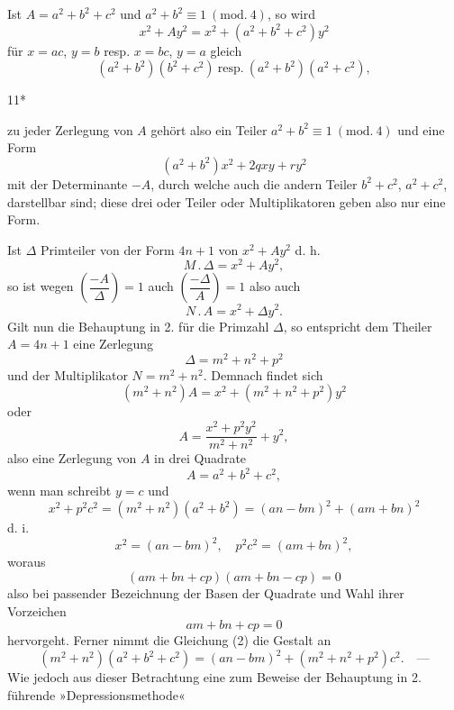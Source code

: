  Ist $A=a^2+b^2+c^2$ und $a^2+b^2\equiv1\ (\mathrm{mod.}\ 4)$, so wird
\[
x^2+Ay^2=x^2+(a^2+b^2+c^2)y^2
\]
\noindent für $x=ac$, $y=b$ resp. $x=bc$, $y=a$ gleich
\[
(a^2+b^2)(b^2+c^2)\ \text{resp.}\ (a^2+b^2)(a^2+c^2),
\]
\par\vfill\noindent\hfill11*\par\clearpage
{}
\noindent zu jeder Zerlegung von $A$ gehört also ein Teiler $a^2+b^2\equiv1\ (\mathrm{mod.}\ 4)$ und eine Form
\[
(a^2+b^2)x^2+2qxy+ry^2
\]
\noindent mit der Determinante $-A$, durch welche auch die andern Teiler $b^2+c^2$, $a^2+c^2$, darstellbar sind; diese
drei  oder  Teiler oder Multiplikatoren geben also nur eine Form.
\par\noindent\hspace*{\parindent} Ist $\Delta$ Primteiler von der Form $4n+1$ von $x^2+Ay^2$ d. h.
\[
M\mathpunct{.}\Delta=x^2+Ay^2,
\]
\noindent so ist wegen $\left(\dfrac{-A}{\Delta}\right)=1$ auch $\left(\dfrac{-\Delta}{A}\right)=1$ also auch
\[
N\mathpunct{.}A=x^2+\Delta y^2.
\]
\noindent Gilt nun die Behauptung in 2. für die Primzahl $\Delta$, so entspricht dem Theiler $A=4n+1$ eine Zerlegung
\begin{equation*}\Delta=m^2+n^2+p^2\tag*{(1)}\end{equation*}
\noindent und der Multiplikator $N=m^2+n^2$. Demnach findet sich
\begin{equation*}(m^2+n^2)A=x^2+(m^2+n^2+p^2)y^2\tag*{(2)}\end{equation*}
\noindent oder
\[
A=\frac{x^2+p^2y^2}{m^2+n^2}+y^2,
\]
\noindent also eine Zerlegung von $A$ in drei Quadrate
\begin{equation*}A=a^2+b^2+c^2,\tag*{(3)}\end{equation*}
\noindent wenn man schreibt $y=c$ und
\[
x^2+p^2c^2=(m^2+n^2)(a^2+b^2)=(an-bm)^2+(am+bn)^2
\]
\noindent d. i.
\[
x^2=(an-bm)^2,\quad p^2c^2=(am+bn)^2,
\]
\noindent woraus
\[
(am+bn+cp)(am+bn-cp)=0
\]
\noindent also bei passender Bezeichnung der Basen der Quadrate und Wahl ihrer Vorzeichen
\begin{equation*}am+bn+cp=0\tag*{(4)}\end{equation*}
\noindent hervorgeht. Ferner nimmt die Gleichung (2) die Gestalt an
\begin{equation*}(m^2+n^2)(a^2+b^2+c^2)=(an-bm)^2+(m^2+n^2+p^2)c^2.\quad\text{—}\tag*{(5)}\end{equation*}
\noindent Wie jedoch aus dieser Betrachtung eine zum Beweise der Behauptung in 2. führende »Depressionsmethode«
